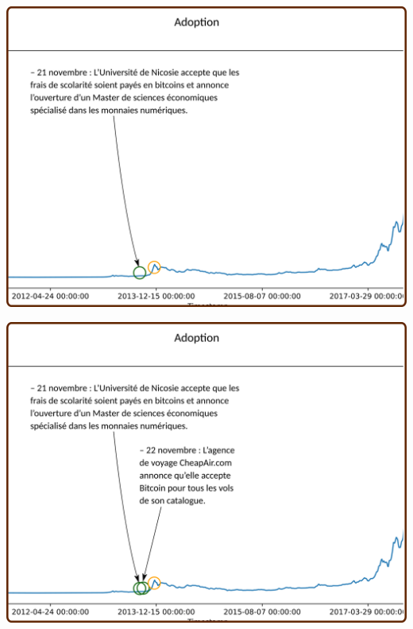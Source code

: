 \documentclass[presentation]{beamer}
\begin{document}
\begin{frame}[label={sec:org6126cdb}]{}
\begin{center}
\includegraphics[width=.95\textwidth]{./Pictures/Timeline/23adoption_univ.png}
\end{center}
\end{frame}

\begin{frame}[label={sec:org02f5a82}]{}
\begin{center}
\includegraphics[width=.95\textwidth]{./Pictures/Timeline/23adoption_voyage.png}
\end{center}
\end{frame}
\end{document}
